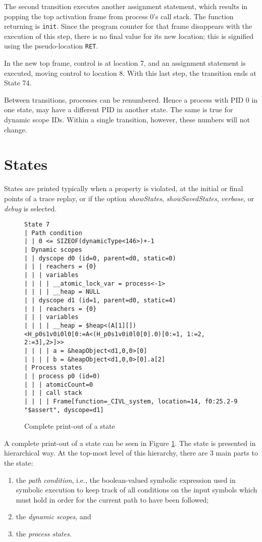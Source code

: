 The second transition executes another assignment statement, which results in
popping the top activation frame from process 0's call stack. The
function returning is \texttt{init}.  Since the program counter for
that frame disappears with the execution of this step, there is no
final value for its new location; this is signified using the
pseudo-location \texttt{RET}.

In the new top frame, control is at location 7, and an assignment
statement is executed, moving control to location 8.  With this last
step, the transition ends at State 74.

Between transitions, processes can be renumbered.  Hence a process
with PID 0 in one state, may have a different PID in another state.
The same is true for dynamic scope IDs.  Within a single transition,
however, these numbers will not change.

\section{States}

States are printed typically when a property is violated, at the
initial or final points of a trace replay, or if the option
\emph{showStates}, \emph{showSavedStates}, \emph{verbose}, or
\emph{debug} is selected.

\begin{figure}
  \begin{small}
\begin{verbatim}
State 7
| Path condition
| | 0 <= SIZEOF(dynamicType<146>)+-1
| Dynamic scopes
| | dyscope d0 (id=0, parent=d0, static=0)
| | | reachers = {0}
| | | variables
| | | | __atomic_lock_var = process<-1>
| | | | __heap = NULL
| | dyscope d1 (id=1, parent=d0, static=4)
| | | reachers = {0}
| | | variables
| | | | __heap = $heap<(A[1][])<H_p0s1v0i0l0[0:=A<(H_p0s1v0i0l0[0].0)[0:=1, 1:=2, 2:=3],2>]>>
| | | | a = &heapObject<d1,0,0>[0]
| | | | b = &heapObject<d1,0,0>[0].a[2]
| Process states
| | process p0 (id=0)
| | | atomicCount=0
| | | call stack
| | | | Frame[function=_CIVL_system, location=14, f0:25.2-9 "$assert", dyscope=d1]
\end{verbatim}
  \end{small}
  \caption{Complete print-out of a state}
  \label{fig:state-print}
\end{figure}

A complete print-out of a state can be seen in Figure
\ref{fig:state-print}.  The state is presented in hierarchical way.
At the top-most level of this hierarchy, there are 3 main parts to the
state:
\begin{enumerate}
\item the \emph{path condition}, i.e., the boolean-valued symbolic
  expression used in symbolic execution to keep track of all
  conditions on the input symbols which must hold in order for the
  current path to have been followed;
\item the \emph{dynamic scopes}, and
\item the \emph{process states}.
\end{enumerate}

